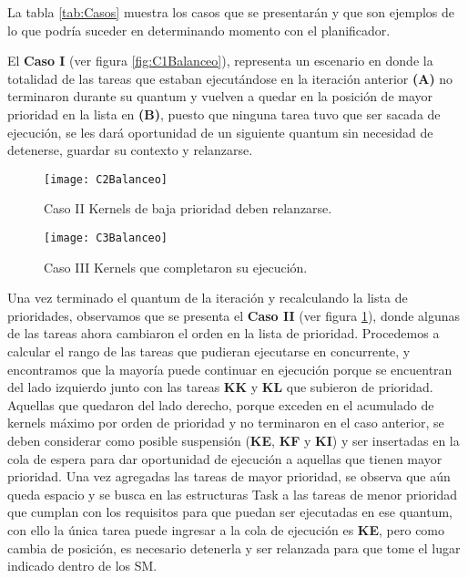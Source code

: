 La tabla \ref{tab:Casos} muestra los casos que se presentarán y que son ejemplos de lo que podría suceder en determinando momento con el planificador.
\newline

El \textbf{Caso I} (ver figura \ref{fig:C1Balanceo}), representa un escenario en donde la totalidad de las tareas que estaban ejecutándose en la iteración anterior \textbf{(A)} no terminaron durante su quantum y vuelven a quedar en la posición de mayor prioridad en la lista en \textbf{(B)}, puesto que ninguna tarea tuvo que ser sacada de ejecución, se les dará oportunidad de un siguiente quantum sin necesidad de detenerse, guardar su contexto y relanzarse.
    \newline
    
    \begin{figure}[!]
      \centering
        \texttt{[image: C2Balanceo]}
        \caption{Caso II Kernels de baja prioridad deben relanzarse.}
        \label{fig:C2Balanceo}
    \end{figure}
    
    \begin{figure}[!]
      \centering
        \texttt{[image: C3Balanceo]}
        \caption{Caso III Kernels que completaron su ejecución.}
        \label{fig:C3Balanceo}
    \end{figure}
    
    Una vez terminado el quantum de la iteración y recalculando la lista de prioridades, observamos que se presenta el \textbf{Caso II} (ver figura \ref{fig:C2Balanceo}), donde algunas de las tareas ahora cambiaron el orden en la lista de prioridad. Procedemos a calcular el rango de las tareas que pudieran ejecutarse en concurrente, y encontramos que la mayoría puede continuar en ejecución porque se encuentran del lado izquierdo junto con las tareas \textbf{KK} y \textbf{KL} que subieron de prioridad. Aquellas que quedaron del lado derecho, porque exceden en el acumulado de kernels máximo por orden de prioridad y no terminaron en el caso anterior, se deben considerar como posible suspensión (\textbf{KE}, \textbf{KF} y \textbf{KI}) y ser insertadas en la cola de espera para dar oportunidad de ejecución a aquellas que tienen mayor prioridad.
    Una vez agregadas las tareas de mayor prioridad, se observa que aún queda espacio y se busca en las estructuras Task a las tareas de menor prioridad que cumplan con los requisitos para que puedan ser ejecutadas en ese quantum, con ello la única tarea puede ingresar a la cola de ejecución es \textbf{KE}, pero como cambia de posición, es necesario detenerla y ser relanzada para que tome el lugar indicado dentro de los SM.     
    \newline
    
